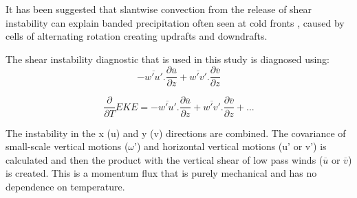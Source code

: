 %	

It has been suggested that slantwise convection from the release of shear instability can explain banded precipitation often seen at cold fronts \citep{bennetts1979conditional, seltzer1985possible}, caused by cells of alternating rotation creating updrafts and downdrafts.

The shear instability diagnostic that is used in this study is diagnosed using:
\begin{equation} \label{eq_diag}
-\overline{w'u'} . \frac{\partial{\overline u}}{\partial z} + \overline{w'v'} . \frac{\partial{\overline v}}{\partial z}
\end{equation}

\begin{equation} \label{eq_diag}
\frac{\partial}{\partial{T}} EKE = -\overline{w'u'} . \frac{\partial{\overline u}}{\partial z} + \overline{w'v'} . \frac{\partial{\overline v}}{\partial z} + ...
\end{equation}

The instability in the x (u) and y (v) directions are combined. The covariance of small-scale vertical motions ($\omega$') and horizontal vertical motions (u' or v') is calculated and then the  product with the vertical shear of low pass winds ($\overline{u}$ or $\overline{v}$)  is created. This is a momentum flux that is purely mechanical and has no dependence on temperature.

%

